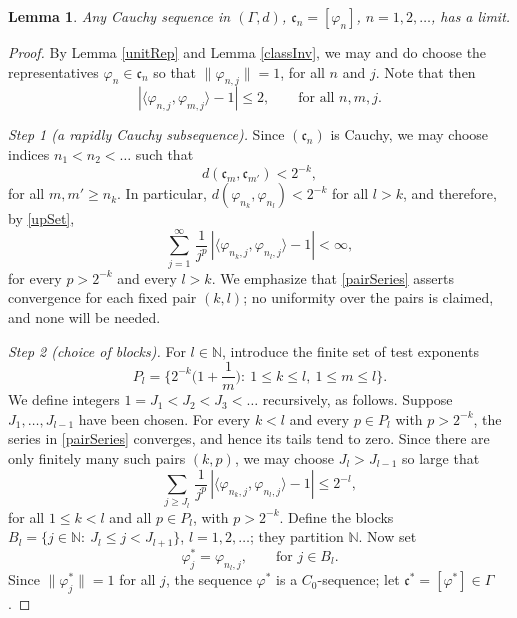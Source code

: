 \documentclass[twoside,11pt,letter]{article}
\def\bN{\mathbb{N}}
\def\fc{{\mathfrak{c}}}
\theoremstyle{definition}
\theoremstyle{definition}
\theoremstyle{plain}
\newtheorem{lemma}[theorem]{Lemma}
\begin{document}
\begin{lemma}\label{complLem}
Any Cauchy sequence in $(\Gamma,d)$, $\fc_n=[\varphi_n]$, $n=1,2,\ldots$, has a limit.
\end{lemma}
\begin{proof}
By Lemma \ref{unitRep} and Lemma \ref{classInv}, we may and do choose the representatives $\varphi_n\in\fc_n$ so that $\|\varphi_{n,j}\|=1$, for all $n$ and $j$. Note that then
\begin{equation}\label{unitBound}
|\langle\varphi_{n,j},\varphi_{m,j}\rangle-1|\leq 2,\qquad\text{for all }n,m,j.
\end{equation}

\smallskip\noindent\textit{Step 1 (a rapidly Cauchy subsequence).}
Since $(\fc_n)$ is Cauchy, we may choose indices $n_1<n_2<\ldots$ such that
\begin{equation}\label{rapidCauchy}
d(\fc_m,\fc_{m'})<2^{-k},
\end{equation}
for all $m,m'\geq n_k$. In particular, $d(\varphi_{n_k},\varphi_{n_l})<2^{-k}$ for all $l>k$, and therefore, by \eqref{upSet},
\begin{equation}\label{pairSeries}
\sum_{j=1}^\infty\,\frac{1}{j^p}\,|\langle \varphi_{n_k,j},\varphi_{n_l,j}\rangle-1|<\infty,
\end{equation}
for every $p>2^{-k}$ and every $l>k$. We emphasize that \eqref{pairSeries} asserts convergence for each fixed pair $(k,l)$; no uniformity over the pairs is claimed, and none will be needed.

\smallskip\noindent\textit{Step 2 (choice of blocks).}
For $l\in\bN$, introduce the finite set of test exponents
\begin{equation*}
P_l=\Big\{2^{-k}\Big(1+\frac{1}{m}\Big):\:1\leq k\leq l,\ 1\leq m\leq l\Big\}.
\end{equation*}
We define integers $1=J_1<J_2<J_3<\ldots$ recursively, as follows. Suppose $J_1,\ldots,J_{l-1}$ have been chosen. For every $k<l$ and every $p\in P_l$ with $p>2^{-k}$, the series in \eqref{pairSeries} converges, and hence its tails tend to zero. Since there are only finitely many such pairs $(k,p)$, we may choose $J_l>J_{l-1}$ so large that
\begin{equation}\label{tailBound}
\sum_{j\geq J_l}\,\frac{1}{j^p}\,|\langle \varphi_{n_k,j},\varphi_{n_l,j}\rangle-1|\leq 2^{-l},
\end{equation}
for all $1\leq k<l$ and all $p\in P_l$, with $p>2^{-k}.$ Define the blocks $B_l=\{j\in\bN:\:J_l\leq j<J_{l+1}\}$, $l=1,2,\ldots$; they partition $\bN$. Now set
\begin{equation*}
\varphi^\ast_j=\varphi_{n_l,j},\qquad\text{for }j\in B_l .
\end{equation*}
Since $\|\varphi^\ast_j\|=1$ for all $j$, the sequence $\varphi^\ast$ is a $C_0$-sequence; let $\fc^\ast=[\varphi^\ast]\in\Gamma$.


\end{proof}
\end{document}
